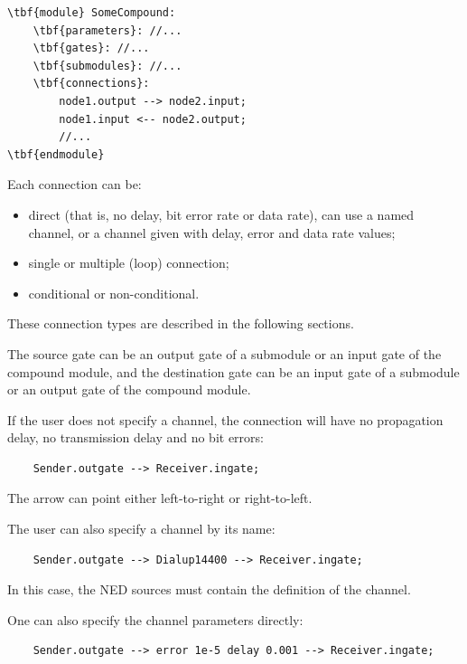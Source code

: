 \begin{Verbatim}[commandchars=\\\{\}]
\tbf{module} SomeCompound:
    \tbf{parameters}: //...
    \tbf{gates}: //...
    \tbf{submodules}: //...
    \tbf{connections}:
        node1.output --> node2.input;
        node1.input <-- node2.output;
        //...
\tbf{endmodule}
\end{Verbatim}



Each connection can be:
\begin{itemize}
  \item{direct (that is, no delay, bit error rate or data rate), can 
    use a named channel, or a channel given with delay, error and 
    data rate values;}
\item{single or multiple (loop) connection;}
\item{conditional or non-conditional.}
\end{itemize}

These connection types are described in the following sections.




The source gate can be an output gate of a submodule or an input 
gate of the compound module, and the destination gate can be 
an input gate of a submodule or an output gate of the compound 
module.


If the user does not specify a channel, the connection will have 
no propagation delay, no transmission delay and no bit errors:
\begin{Verbatim}
    Sender.outgate --> Receiver.ingate;
\end{Verbatim}

The arrow can point either left-to-right or right-to-left.

The user can also specify a channel by its name:
\begin{Verbatim}
    Sender.outgate --> Dialup14400 --> Receiver.ingate;
\end{Verbatim}

In this case, the NED sources must contain the definition of 
the channel.

One can also specify the channel parameters directly:
\begin{Verbatim}
    Sender.outgate --> error 1e-5 delay 0.001 --> Receiver.ingate;
\end{Verbatim}

